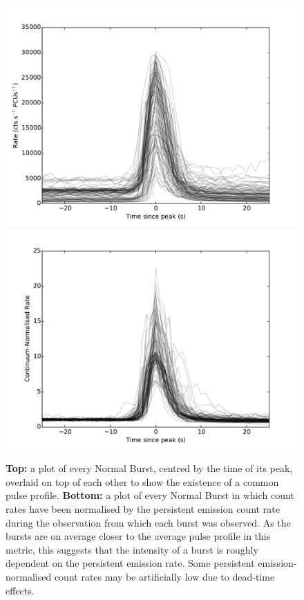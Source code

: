 \begin{figure}
  \centering
  \includegraphics[width=.9\linewidth, trim={0.4cm 0 1.1cm 0},clip]{images/1000norm.pdf}
  \includegraphics[width=.9\linewidth, trim={0.4cm 0 1.1cm 0},clip]{images/1000norm_renormed.pdf}
  \caption{\small \textbf{Top:} a plot of every Normal Burst, centred by the time of its peak, overlaid on top of each other to show the existence of a common pulse profile.  \textbf{Bottom:} a plot of every Normal Burst in which count rates have been normalised by the persistent emission count rate during the observation from which each burst was observed.  As the bursts are on average closer to the average pulse profile in this metric, this suggests that the intensity of a burst is roughly dependent on the persistent emission rate.  Some persistent emission-normalised count rates may be artificially low due to dead-time effects.}
  \label{fig:norm_overlay}
\end{figure}

